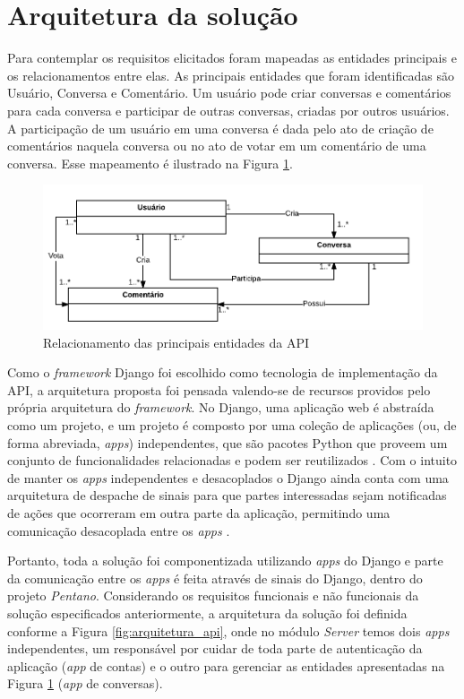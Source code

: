 \section{Arquitetura da solução}

Para contemplar os requisitos elicitados foram mapeadas as entidades principais e os relacionamentos entre elas. 
As principais entidades que foram identificadas são Usuário, Conversa e Comentário. Um usuário pode criar
conversas e comentários para cada conversa e participar de outras conversas, criadas por outros usuários.
A participação de um usuário em uma conversa é dada pelo ato de criação de comentários naquela conversa ou
no ato de votar em um comentário de uma conversa. Esse mapeamento é ilustrado na Figura \ref{fig:entidades}.

\begin{figure}[h!]
\centering
\includegraphics[scale=0.5]{figuras/entidades.png}
\caption{Relacionamento das principais entidades da API}
\label{fig:entidades}
\end{figure}

Como o \textit{framework} Django foi escolhido como tecnologia de implementação da API, a arquitetura proposta foi pensada valendo-se de 
recursos providos pelo própria arquitetura do \textit{framework}.
No Django, uma aplicação web é abstraída como um projeto, e um projeto é composto por uma coleção de aplicações
(ou, de forma abreviada, \textit{apps}) independentes, que
são pacotes Python que proveem um conjunto de funcionalidades relacionadas e podem ser reutilizados \cite{django_apps}.
Com o intuito de manter os \textit{apps} independentes e desacoplados o Django ainda conta com uma arquitetura de despache
de sinais para que partes interessadas sejam notificadas de ações que ocorreram em outra parte da aplicação, permitindo uma comunicação
desacoplada entre os \textit{apps} \cite{django_signals}.

Portanto, toda a solução foi componentizada utilizando \textit{apps} do 
Django e parte da comunicação entre os \textit{apps} é feita através de sinais do Django, dentro do projeto \emph{Pentano}.
Considerando os requisitos funcionais e não funcionais da solução especificados anteriormente, a arquitetura da solução foi definida 
conforme a Figura \ref{fig:arquitetura_api}, onde no módulo \textit{Server} temos dois \textit{apps} independentes, um responsável
por cuidar de toda parte de autenticação da aplicação (\textit{app} de contas) e o outro para gerenciar as entidades apresentadas na
Figura \ref{fig:entidades} (\textit{app} de conversas).

